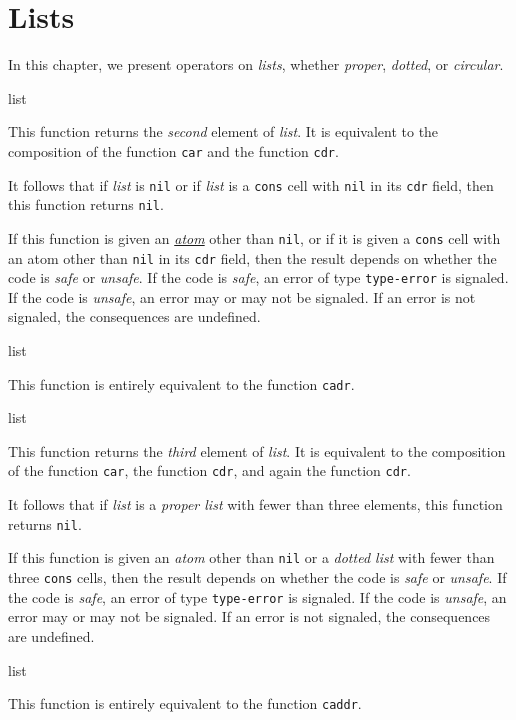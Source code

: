 \chapter{Lists}

In this chapter, we present operators on \emph{lists}, whether
\emph{proper}, \emph{dotted}, or \emph{circular}.  

 {list}

This function returns the \emph{second} element of \textit{list}.  It
is equivalent to the composition of the function \texttt{car} and the
function \texttt{cdr}.  

It follows that if \textit{list} is \texttt{nil} or if \textit{list}
is a \texttt{cons} cell with \texttt{nil} in its \texttt{cdr} field,
then this function returns \texttt{nil}.  

If this function is given an \hyperref[glossary-atom]
{\emph{atom}} other than \texttt{nil}, or if it is given a
\texttt{cons} cell with an atom other than \texttt{nil} in its
\texttt{cdr} field, then the result depends on whether the code is
\emph{safe} or \emph{unsafe}.  If the code is \emph{safe}, an error of
type \texttt{type-error} is signaled.  If the code is \emph{unsafe},
an error may or may not be signaled.  If an error is not signaled, the
consequences are undefined.

 {list}

This function is entirely equivalent to the function \texttt{cadr}. 

 {list}

This function returns the \emph{third} element of \textit{list}.  It
is equivalent to the composition of the function \texttt{car}, the
function \texttt{cdr}, and again the function \texttt{cdr}.

It follows that if \textit{list} is a \emph{proper list} with fewer
than three elements, this function returns \texttt{nil}.

If this function is given an \emph{atom} other than \texttt{nil} or a
\emph{dotted list} with fewer than three \texttt{cons} cells, then the
result depends on whether the code is \emph{safe} or \emph{unsafe}.
If the code is \emph{safe}, an error of type \texttt{type-error} is
signaled.  If the code is \emph{unsafe}, an error may or may not be
signaled.  If an error is not signaled, the consequences are
undefined.

 {list}

This function is entirely equivalent to the function \texttt{caddr}. 

